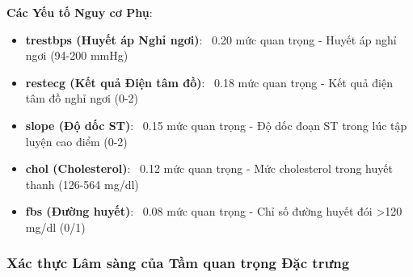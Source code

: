 \textbf{Các Yếu tố Nguy cơ Phụ}:
\begin{itemize}
    \item \textbf{trestbps (Huyết áp Nghỉ ngơi)}: ~0.20 mức quan trọng - Huyết áp nghỉ ngơi (94-200 mmHg)
    \item \textbf{restecg (Kết quả Điện tâm đồ)}: ~0.18 mức quan trọng - Kết quả điện tâm đồ nghỉ ngơi (0-2)
    \item \textbf{slope (Độ dốc ST)}: ~0.15 mức quan trọng - Độ dốc đoạn ST trong lúc tập luyện cao điểm (0-2)
    \item \textbf{chol (Cholesterol)}: ~0.12 mức quan trọng - Mức cholesterol trong huyết thanh (126-564 mg/dl)
    \item \textbf{fbs (Đường huyết)}: ~0.08 mức quan trọng - Chỉ số đường huyết đói >120 mg/dl (0/1)
\end{itemize}

\subsubsection{Xác thực Lâm sàng của Tầm quan trọng Đặc trưng}

